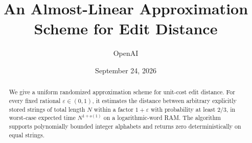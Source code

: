 \documentclass[11pt]{article}
\title{An Almost-Linear Approximation Scheme for Edit Distance}
\author{OpenAI}
\date{September 24, 2026}
\begin{document}
\maketitle
\begin{abstract}
We give a uniform randomized approximation scheme for unit-cost edit distance.
For every fixed rational $\varepsilon\in(0,1)$, it estimates the distance
between arbitrary explicitly stored strings of total length $N$ within a
factor $1+\varepsilon$ with probability at least $2/3$, in worst-case expected
time $N^{1+o(1)}$ on a logarithmic-word RAM.
The algorithm supports polynomially bounded integer alphabets and returns zero
deterministically on equal strings.
\end{abstract}
{\small\tableofcontents}
\clearpage












\end{document}
